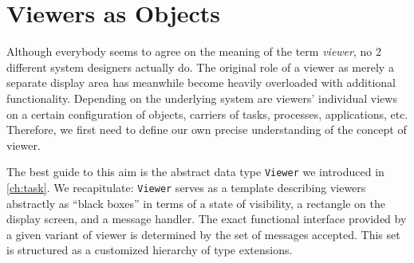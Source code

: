 \section{Viewers as Objects}
\label{sec:viewers}
Although everybody seems to agree on the meaning of the term \emph{viewer},
no 2 different system designers actually do.  The original role of a viewer
as merely a separate display area has meanwhile become heavily overloaded
with additional functionality.  Depending on the underlying system are viewers' individual views
on a certain configuration of objects, carriers of tasks, processes, applications, etc.
Therefore, we first need to define our own precise understanding of the concept of viewer.

The best guide to this aim is the abstract data type \verb|Viewer| we introduced in \ref{ch:task}.
We recapitulate: \verb|Viewer| serves as a template describing viewers abstractly as “black boxes”
in terms of a state of visibility, a rectangle on the display screen, and a message handler.
The exact functional interface provided by a given variant of viewer
is determined by the set of messages accepted.
This set is structured as a customized hierarchy of type extensions.

